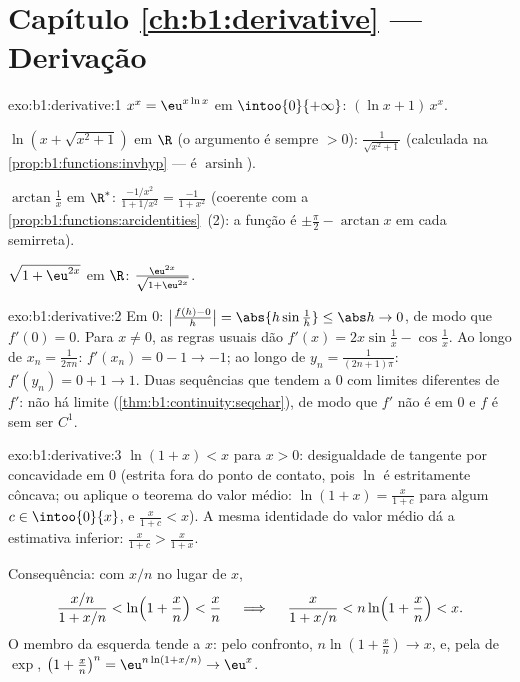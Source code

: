 \section*{Capítulo \ref{ch:b1:derivative} --- Derivação}

\begin{solution}{exo:b1:derivative:1}
$x^x = \eu^{x\ln x}$ em $\intoo{0}{+\infty}$:  $(\ln x +
1)\,x^x$.

$\ln(x + \sqrt{x^2+1})$ em $\R$ (o argumento é sempre $> 0$):
 $\frac{1}{\sqrt{x^2+1}}$ (calculada na
\cref{prop:b1:functions:invhyp} --- é
$\operatorname{arsinh}$).

$\arctan\frac1x$ em $\R^*$:  $\frac{-1/x^2}{1 + 1/x^2} =
\frac{-1}{1 + x^2}$ (coerente com a
\cref{prop:b1:functions:arcidentities}~(2): a função é
$\pm\frac\pi2 - \arctan x$ em cada semirreta).

$\sqrt{1 + \eu^{2x}}$ em $\R$: 
$\frac{\eu^{2x}}{\sqrt{1 + \eu^{2x}}}$.
\end{solution}

\begin{solution}{exo:b1:derivative:2}
Em $0$: $\bigl|\frac{f(h) - 0}{h}\bigr| = \abs{h \sin\frac1h} \leq
\abs h \to 0$, de modo que $f'(0) = 0$. Para $x \neq 0$, as regras usuais dão
$f'(x) = 2x\sin\frac1x - \cos\frac1x$. Ao longo de $x_n = \frac{1}{2\pi
n}$: $f'(x_n) = 0 - 1 \to -1$; ao longo de $y_n = \frac{1}{(2n+1)\pi}$:
$f'(y_n) = 0 + 1 \to 1$. Duas sequências que tendem a $0$ com limites
diferentes de $f'$: não há limite (\cref{thm:b1:continuity:seqchar}), de modo que $f'$
não é  em $0$ e $f$ é  sem ser
$C^1$.
\end{solution}

\begin{solution}{exo:b1:derivative:3}
$\ln(1+x) < x$ para $x > 0$: desigualdade de tangente por concavidade em $0$
(estrita fora do ponto de contato, pois $\ln$ é estritamente côncava;
ou aplique o teorema do valor médio: $\ln(1+x) = \frac{x}{1+c}$ para algum
$c \in \intoo{0}{x}$, e $\frac{x}{1+c} < x$). A mesma identidade do valor
médio dá a estimativa inferior: $\frac{x}{1+c} > \frac{x}{1+x}$.

Consequência: com $x/n$ no lugar de $x$,
\[
\frac{x/n}{1 + x/n} < \ln\Bigl(1 + \frac xn\Bigr) < \frac xn
\quad\implies\quad
\frac{x}{1 + x/n} < n \ln\Bigl(1 + \frac xn\Bigr) < x .
\]
O membro da esquerda tende a $x$: pelo confronto, $n\ln(1 + \frac xn)
\to x$, e, pela  de $\exp$, $\bigl(1 + \frac xn\bigr)^n =
\eu^{n\ln(1 + x/n)} \to \eu^x$.
\end{solution}

